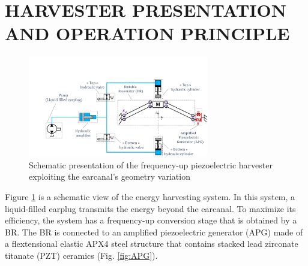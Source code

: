 \documentclass[3p,twocolumn,preprint]{elsarticle}
\begin{document}
\section{HARVESTER PRESENTATION AND OPERATION \mbox{PRINCIPLE}}
\label{sec:HARVESTER PRESENTATION AND OPERATION PRINCIPLE}
\begin{figure}[!htbp]
	\centering
	\captionsetup{justification=centering}
	\includegraphics[trim={3.2cm 0cm 0cm 4.3cm},clip, width=0.7\textwidth]{figures/system_presentation.pdf}
	\caption{Schematic presentation of the frequency-up piezoelectric harvester exploiting the earcanal's geometry variation} 
	\label{fig:system_presentation}
\end{figure}
Figure \ref{fig:system_presentation} is a schematic view of the energy harvesting system. In this system, a liquid-filled earplug transmits the energy beyond the earcanal. To maximize its efficiency, the system has a frequency-up conversion stage that is obtained by a BR. The BR is connected to an amplified piezoelectric generator (APG) \cite{CEDRATTECHNOLOGIES2022} made of a flextensional elastic APX4 steel \cite{AUBERT&DUVAL2022} structure that contains stacked lead zirconate titanate (PZT) ceramics (Fig. \ref{fig:APG}).
\end{document}
